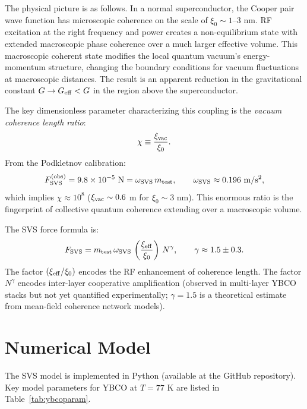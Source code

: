 \documentclass[12pt,a4paper]{article}
\begin{document}
The physical picture is as follows. In a normal superconductor, the Cooper pair wave function has microscopic coherence on the scale of $\xi_0\sim 1$--$3$ nm. RF excitation at the right frequency and power creates a non-equilibrium state with extended macroscopic phase coherence over a much larger effective volume. This macroscopic coherent state modifies the local quantum vacuum's energy-momentum structure, changing the boundary conditions for vacuum fluctuations at macroscopic distances. The result is an apparent reduction in the gravitational constant $G\to G_{\rm eff}<G$ in the region above the superconductor.

The key dimensionless parameter characterizing this coupling is the \emph{vacuum coherence length ratio}:
\begin{equation}
\chi \equiv \frac{\xi_{\rm vac}}{\xi_0}.
\end{equation}
From the Podkletnov calibration:
\begin{equation}
F_{\rm SVS}^{\rm(obs)} = 9.8\times10^{-5}\ {\rm N}
= \omega_{\rm SVS}\,m_{\rm test},
\qquad \omega_{\rm SVS}\approx 0.196\ {\rm m/s^2},
\end{equation}
which implies $\chi\approx 10^8$ ($\xi_{\rm vac}\sim 0.6$ m for $\xi_0\sim 3$ nm). This enormous ratio is the fingerprint of collective quantum coherence extending over a macroscopic volume.

The SVS force formula is:
\begin{equation}\label{eq:svs}
F_{\rm SVS}=m_{\rm test}\,\omega_{\rm SVS}\,
\left(\frac{\xi_{\rm eff}}{\xi_0}\right)\,N^\gamma,
\qquad \gamma\approx 1.5\pm0.3.
\end{equation}
The factor $(\xi_{\rm eff}/\xi_0)$ encodes the RF enhancement of coherence length. The factor $N^\gamma$ encodes inter-layer cooperative amplification (observed in multi-layer YBCO stacks but not yet quantified experimentally; $\gamma=1.5$ is a theoretical estimate from mean-field coherence network models).

\section{Numerical Model}\label{sec:model}

The SVS model is implemented in Python (available at the GitHub repository). Key model parameters for YBCO at $T=77$ K are listed in Table~\ref{tab:ybcoparam}.
\end{document}
